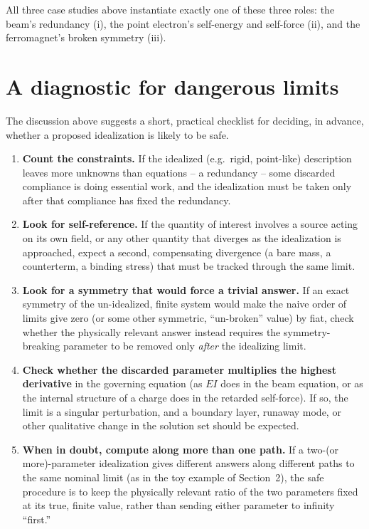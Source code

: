 \documentclass[11pt]{article}
\begin{document}
All three case studies above instantiate exactly one of these three roles: the beam's redundancy (i), the point electron's self-energy and self-force (ii), and the ferromagnet's broken symmetry (iii).

\section{A diagnostic for dangerous limits}

The discussion above suggests a short, practical checklist for deciding, in advance, whether a proposed idealization is likely to be safe.

\begin{enumerate}[label=(\arabic*)]
\item \textbf{Count the constraints.} If the idealized (e.g.\ rigid, point-like) description leaves more unknowns than equations -- a redundancy -- some discarded compliance is doing essential work, and the idealization must be taken only after that compliance has fixed the redundancy.
\item \textbf{Look for self-reference.} If the quantity of interest involves a source acting on its own field, or any other quantity that diverges as the idealization is approached, expect a second, compensating divergence (a bare mass, a counterterm, a binding stress) that must be tracked through the same limit.
\item \textbf{Look for a symmetry that would force a trivial answer.} If an exact symmetry of the un-idealized, finite system would make the naive order of limits give zero (or some other symmetric, ``un-broken'' value) by fiat, check whether the physically relevant answer instead requires the symmetry-breaking parameter to be removed only \emph{after} the idealizing limit.
\item \textbf{Check whether the discarded parameter multiplies the highest derivative} in the governing equation (as $EI$ does in the beam equation, or as the internal structure of a charge does in the retarded self-force). If so, the limit is a singular perturbation, and a boundary layer, runaway mode, or other qualitative change in the solution set should be expected.
\item \textbf{When in doubt, compute along more than one path.} If a two-(or more)-parameter idealization gives different answers along different paths to the same nominal limit (as in the toy example of Section~2), the safe procedure is to keep the physically relevant ratio of the two parameters fixed at its true, finite value, rather than sending either parameter to infinity ``first.''
\end{enumerate}
\end{document}
